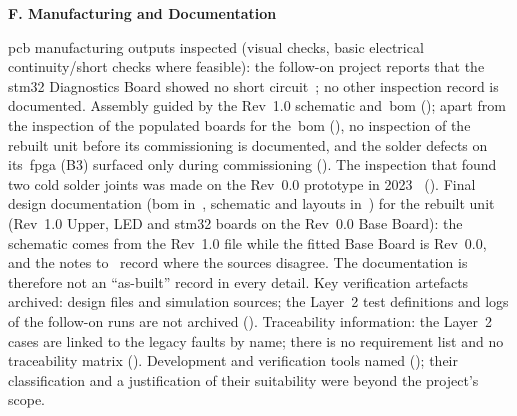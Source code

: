 \medskip
\noindent\textbf{F. Manufacturing and Documentation}
\begin{checklist}
	 \gls{pcb} manufacturing outputs inspected (visual checks, basic electrical continuity/short checks where feasible): the follow-on project reports that the \gls{stm32} Diagnostics Board showed no short circuit~\cite[p.~22]{savchuk2025}; no other inspection record is documented.
	 Assembly guided by the Rev~1.0 schematic and~\gls{bom} (); apart from the inspection of the populated boards for the~\gls{bom} (), no inspection of the rebuilt unit before its commissioning is documented, and the solder defects on its~\gls{fpga} (B3) surfaced only during commissioning (). The inspection that found two cold solder joints was made on the Rev~0.0 prototype in 2023~\cite[Sec.~4.3]{leyer2023} ().
	 Final design documentation (\gls{bom} in~, schematic and layouts in~) for the rebuilt unit (Rev~1.0 Upper, LED and \gls{stm32} boards on the Rev~0.0 Base Board): the schematic comes from the Rev~1.0 file while the fitted Base Board is Rev~0.0, and the notes to~ record where the sources disagree. The documentation is therefore not an \enquote{as-built} record in every detail.
	 Key verification artefacts archived: design files and simulation sources; the Layer~2 test definitions and logs of the follow-on runs are not archived ().
	 Traceability information: the Layer~2 cases are linked to the legacy faults by name; there is no requirement list and no traceability matrix ().
	 Development and verification tools named (); their classification and a justification of their suitability were beyond the project's scope.
\end{checklist}